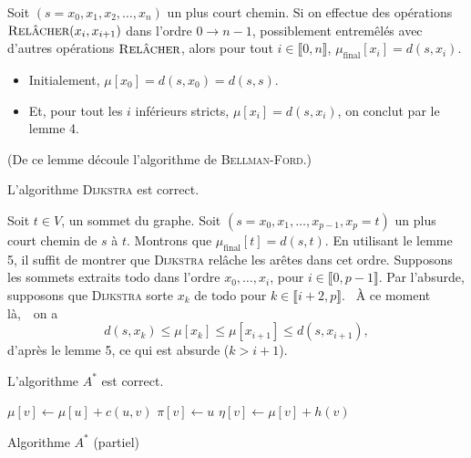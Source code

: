{{		\begin{numlem}
			Soit $(s=x_0, x_1, x_2, \ldots, x_n)$ un plus court chemin. Si on effectue des opérations \hbox{$\textsc{Relâcher}(x_i, x_{i+1})$} dans l'ordre $0 \to n - 1$, possiblement entremêlés avec d'autres opérations $\textsc{Relâcher}$, alors pour tout $i \in \llbracket 0,n \rrbracket$, $\mu_{\text{final}}[x_i] = d(s, x_i)$.
		\end{numlem}
	
		\begin{prv}
			\begin{itemize}
				\item Initialement, $\mu[x_0] = d(s, x_0) = d(s,s)$.
				\item Et, pour tout les $i$ inférieurs stricts, $\mu[x_i] = d(s, x_i)$, on conclut par le lemme 4.
			\end{itemize}
		\end{prv}
	
		(De ce lemme découle l'algorithme de \textsc{Bellman-Ford}.)
	
		\begin{crlr}
			L'algorithme \textsc{Dijkstra} est correct.
		\end{crlr}
	
		\begin{prv}
			Soit $t \in V$, un sommet du graphe. Soit $(s = x_0, x_1, \ldots, x_{p-1}, x_p = t)$ un plus court chemin de $s$ à $t$. Montrons que $\mu_{\text{final}}[t] = d(s, t)$.
			En utilisant le lemme 5, il suffit de montrer que \textsc{Dijkstra} relâche les arêtes dans cet ordre.
			Supposons les sommets extraits $\mathrm{todo}$ dans l'ordre $x_0, \ldots, x_i$, pour $i \in \llbracket 0,p-1 \rrbracket$.
			Par l'absurde, supposons que \textsc{Dijkstra} sorte $x_k$ de $\mathrm{todo}$ pour $k \in \llbracket i+2, p \rrbracket$.
			\guillemotleft~À ce moment là,~\guillemotright\ on a \[
				d(s, x_k) \le \mu[x_k] \le \mu[x_{i+1}] \le d(s, x_{i+1}),
			\]d'après le lemme 5, ce qui est absurde ($k > i + 1$).
		\end{prv}
	
		\begin{crlr}
			L'algorithme $A^*$ est correct.
		\end{crlr}
	
		\begin{algorithm}[H]
			\centering
			\begin{algorithmic}[1]
				\State $\mu[v] \gets \mu[u] + c(u,v)$
				\State $\pi[v] \gets u$
				\State $\eta[v] \gets \mu[v] + h(v)$
				\EndIf
				\EndProcedure
			\end{algorithmic}
			\caption{Algorithme $A^*$ (partiel)}
		\end{algorithm}
	
}}
